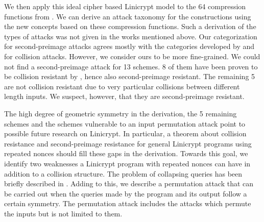 We then apply this ideal cipher based Linicrypt model to the 64 compression functions from \cite{C:PreGovVan93}.
We can derive an attack taxonomy for the \MD constructions using the new concepts based on these compression functions.
Such a derivation of the types of attacks was not given in the works mentioned above.
Our categorization for second-preimage attacks agrees mostly with the categories developed by \cite{C:PreGovVan93} and \cite{C:BlaRogShr02} for collision attacks.
However, we consider ours to be more fine-grained.
We could not find a second-preimage attack for 13 schemes.
8 of them have been proven to be collision resistant by \cite{C:BlaRogShr02},
hence also second-preimage resistant.
The remaining 5 are not collision resistant due to very particular collisions between different length inputs.
We suspect, however, that they are second-preimage resistant.

The high degree of geometric symmetry in the derivation,
the 5 remaining schemes and the schemes vulnerable to an input permutation attack point to possible future research on Linicrypt.
In particular,
a theorem about collision resistance and second-preimage resistance for general Linicrypt programs using repeated nonces should fill these gaps in the derivation.
Towards this goal, we identify two weaknesses a Linicrypt program with repeated nonces can have in addition to a collision structure.
The problem of collapsing queries has been briefly described in \cite{TCC:McQSwoRos19}.
Adding to this, we describe a permutation attack that can be carried out when the queries made by the program and its output follow a certain symmetry.
The permutation attack includes the attacks which permute the inputs but is not limited to them.
